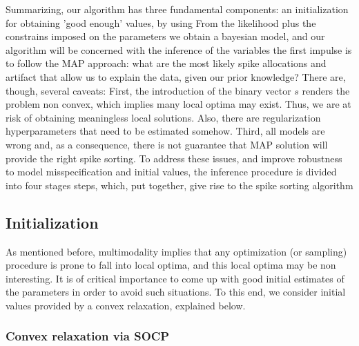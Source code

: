 \documentclass[12pt,letterpaper,fleqn]{article}
\begin{document}
Summarizing, our algorithm has three fundamental components: an initialization for obtaining 'good enough' values,
 by using
From the likelihood plus the constrains imposed on the parameters we obtain a bayesian model, and our algorithm will be concerned with the inference of the variables  the first impulse is to follow the MAP approach: what are the most likely spike allocations and artifact that allow us to explain the data, given our prior knowledge? There are, though, several caveats: First, the introduction of the binary vector $s$ renders the problem non convex, which implies many local optima may exist. Thus, we are at risk of obtaining meaningless local solutions. Also, there are regularization hyperparameters that need to be estimated somehow. Third, all models are wrong and, as a consequence, there is not guarantee that MAP solution will provide the right spike sorting. To address these issues, and improve robustness to model misspecification and initial values, the inference procedure is divided into four stages steps, which, put together, give rise to the spike sorting algorithm


 \subsection{Initialization}
 As mentioned before, multimodality implies that any optimization (or sampling) procedure is prone to fall into local optima, and this local optima may be non interesting. It is of critical importance to come up with good initial estimates of the parameters in order to avoid such situations. To this end, we consider initial values provided by a convex relaxation, explained below.
 
 \subsubsection{Convex relaxation via SOCP}
 
\end{document}
